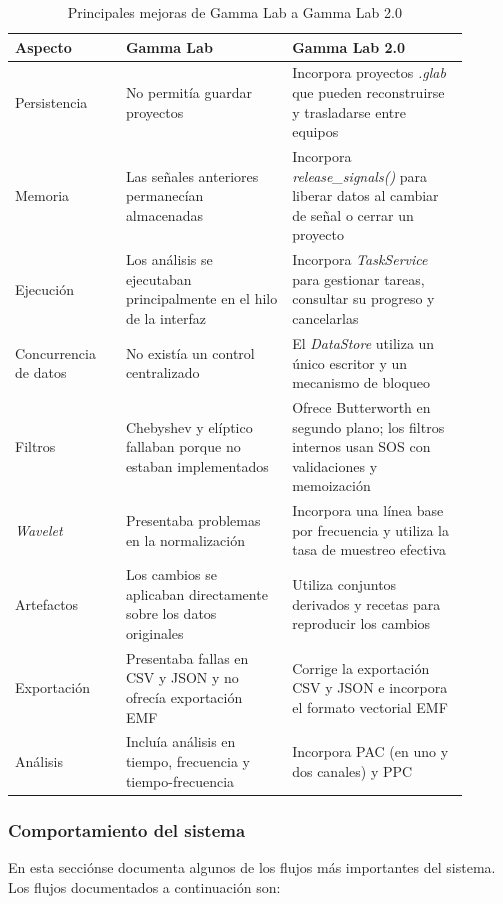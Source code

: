 \documentclass[12pt,letterpaper,oneside]{article}
\begin{document}
\begin{table}[H]
\centering
\small
\begin{tabular}{|p{0.22\linewidth}|p{0.33\linewidth}|p{0.35\linewidth}|}
\hline
\textbf{Aspecto} & \textbf{Gamma Lab} & \textbf{Gamma Lab 2.0} \\ \hline
Persistencia & No permitía guardar proyectos & Incorpora proyectos \textit{.glab} que pueden reconstruirse y trasladarse entre equipos \\ \hline
Memoria & Las señales anteriores permanecían almacenadas & Incorpora \textit{release\_signals()} para liberar datos al cambiar de señal o cerrar un proyecto \\ \hline
Ejecución & Los análisis se ejecutaban principalmente en el hilo de la interfaz & Incorpora \textit{TaskService} para gestionar tareas, consultar su progreso y cancelarlas \\ \hline
Concurrencia de datos & No existía un control centralizado & El \textit{DataStore} utiliza un único escritor y un mecanismo de bloqueo \\ \hline
Filtros & Chebyshev y elíptico fallaban porque no estaban implementados & Ofrece Butterworth en segundo plano; los filtros internos usan SOS con validaciones y memoización \\ \hline
\textit{Wavelet} & Presentaba problemas en la normalización & Incorpora una línea base por frecuencia y utiliza la tasa de muestreo efectiva \\ \hline
Artefactos & Los cambios se aplicaban directamente sobre los datos originales & Utiliza conjuntos derivados y recetas para reproducir los cambios \\ \hline
Exportación & Presentaba fallas en CSV y JSON y no ofrecía exportación EMF & Corrige la exportación CSV y JSON e incorpora el formato vectorial EMF \\ \hline
Análisis & Incluía análisis en tiempo, frecuencia y tiempo-frecuencia & Incorpora PAC (en uno y dos canales) y PPC \\ \hline
\end{tabular}
\caption{Principales mejoras de Gamma Lab a Gamma Lab 2.0}
\label{tab:avances}
\end{table}

\subsubsection{Comportamiento del sistema}

En esta secciónse documenta algunos de los flujos más importantes del sistema.
Los flujos documentados a continuación son:
\end{document}
